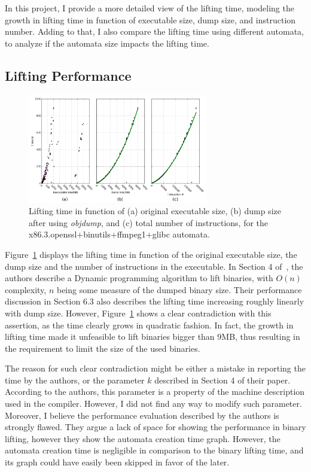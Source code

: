 \documentclass[12pt]{article}
\begin{document}
In this project, I provide a more detailed view of the lifting time, modeling the growth in lifting time in function of executable size, dump size, and instruction number. Adding to that, I also compare the lifting time using different automata, to analyze if the automata size impacts the lifting time.

\subsection{Lifting Performance}\label{subsec:lifting_performance}

\begin{figure}[ht]
\centering
\includegraphics[width=0.7\textwidth]{lifting_time}%
\caption{Lifting time in function of (a) original executable size, (b) dump size after using \textit{objdump}, and (c) total number of instructions, for the x86.3.openssl+binutils+ffmpeg1+glibc automata.}
\label{fig:lifting_time}
\end{figure}

Figure~\ref{fig:lifting_time} displays the lifting time in function of the original executable size, the dump size and the number of instructions in the executable. In Section 4 of~\cite{Hasabnis2014}, the authors describe a Dynamic programming algorithm to lift binaries, with $O(n)$ complexity, $n$ being some measure of the dumped binary size. Their performance discussion in Section 6.3 also describes the lifting time increasing roughly linearly with dump size. However, Figure~\ref{fig:lifting_time} shows a clear contradiction with this assertion, as the time clearly grows in quadratic fashion. In fact, the growth in lifting time made it unfeasible to lift binaries bigger than 9MB, thus resulting in the requirement to limit the size of the used binaries.

The reason for such clear contradiction might be either a mistake in reporting the time by the authors, or the parameter $k$ described in Section 4 of their paper. According to the authors, this parameter is a property of the machine description used in the compiler. However, I did not find any way to modify such parameter. Moreover, I believe the performance evaluation described by the authors is strongly flawed. They argue a lack of space for showing the performance in binary lifting, however they show the automata creation time graph. However, the automata creation time is negligible in comparison to the binary lifting time, and its graph could have easily been skipped in favor of the later. 
\end{document}
